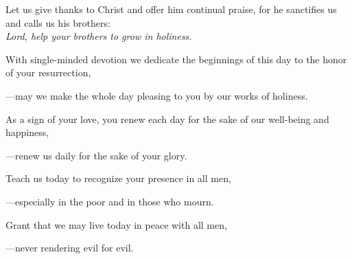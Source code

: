 \intercessions\indent

\begin{hangpar}

Let us give thanks to Christ and offer him continual praise, for he sanctifies us and calls us his brothers:\\
\emph{Lord, help your brothers to grow in holiness.}

\medskip With single-minded devotion we dedicate the beginnings of this day to the honor of your resurrection,

{\color{red}---\thinspace}may we make the whole day pleasing to you by our works of holiness.

\medskip As a sign of your love, you renew each day for the sake of our well-being and happiness,

{\color{red}---\thinspace}renew us daily for the sake of your glory.

\medskip Teach us today to recognize your presence in all men,

{\color{red}---\thinspace}especially in the poor and in those who mourn.

\medskip Grant that we may live today in peace with all men,

{\color{red}---\thinspace}never rendering evil for evil.

\end{hangpar}

